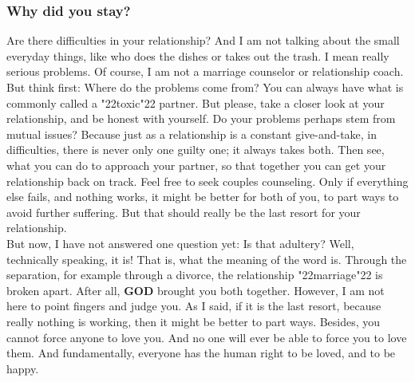 \documentclass[10pt,a5paper]{article}
\newcommand{\God}[0]{\textbf{GOD}}
\newcommand{\q}[1]{\char"22{#1}\char"22 }
\begin{document}
	\subsubsection{Why did you stay?}
		Are there difficulties in your relationship?
		And I am not talking about the small everyday things,
		like who does the dishes or takes out the trash.
		I mean really serious problems.
		Of course,
		I am not a marriage counselor or relationship coach.
		But think first:
		Where do the problems come from?
		You can always have what is commonly called a \q{toxic} partner.
		But please,
		take a closer look at your relationship,
		and be honest with yourself.
		Do your problems perhaps stem from mutual issues?
		Because just as a relationship is a constant give-and-take,
		in difficulties,
		there is never only one guilty one;
		it always takes both.
		Then see,
		what you can do to approach your partner,
		so that together you can get your relationship back on track.
		Feel free to seek couples counseling.
		Only if everything else fails,
		and nothing works,
		it might be better for both of you,
		to part ways to avoid further suffering.
		But that should really be the last resort for your relationship.
		\\
		But now,
		I have not answered one question yet:
		Is that adultery?
		Well,
		technically speaking,
		it is!
		That is,
		what the meaning of the word is.
		Through the separation,
		for example through a divorce,
		the relationship \q{marriage} is broken apart.
		After all,
		{\God} brought you both together.
		However,
		I am not here to point fingers and judge you.
		As I said,
		if it is the last resort,
		because really nothing is working,
		then it might be better to part ways.
		Besides,
		you cannot force anyone to love you.
		And no one will ever be able to force you to love them.
		And fundamentally,
		everyone has the human right to be loved,
		and to be happy.
\end{document}
